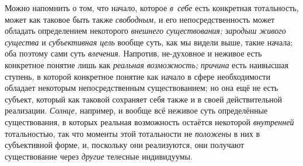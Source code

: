 Можно напомнить о том, что начало, которое {\em в~себе} есть
конкретная тотальность, может как таковое быть также {\em свободным,} и его
непосредственность может обладать определением некоторого
{\em внешнего существования;}
{\em зародыш живого существа} и {\em субъективная цель}
вообще суть, как мы видели выше, такие начала; оба поэтому
сами суть {\em влечения}.
Напротив, не-духовное и неживое есть конкретное понятие лишь
как {\em реальная возможность;} {\em причина} есть
наивысшая ступень, в которой конкретное понятие как начало в сфере
необходимости обладает некоторым непосредственным существованием; но она
ещё не есть субъект, который как таковой сохраняет себя также и в своей
действительной реализации. {\em Солнце,} например, и
вообще всё неживое суть определённые существования, в которых реальная
возможность остаётся некоторой {\em внутренней}
тотальностью, так что моменты этой тотальности не
{\em положены}
в них в субъективной форме, и, поскольку они реализуются, они
получают существование через {\em другие} телесные индивидуумы.

